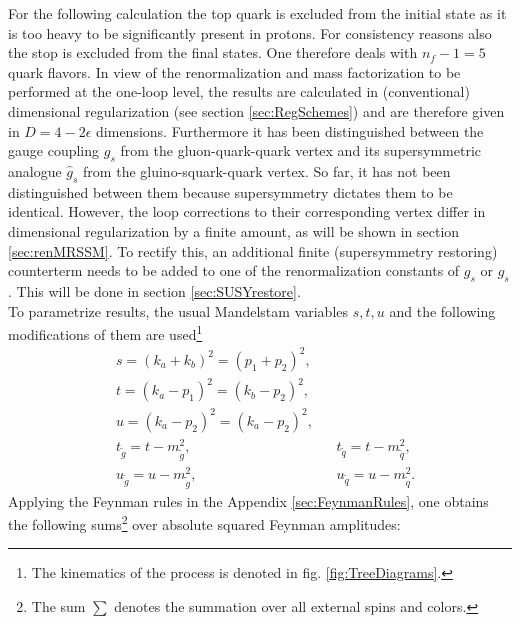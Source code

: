 For the following calculation the top quark is excluded from the initial state as it is too heavy to be significantly present in protons. %
For consistency reasons also the stop is excluded from the final states. One therefore deals with $n_f-1 = 5$ quark flavors. In view of the renormalization and mass factorization to be performed at the one-loop level, the results are calculated in (conventional) dimensional regularization (see section \ref{sec:RegSchemes}) and are therefore given in $D = 4 - 2\epsilon$ dimensions. Furthermore it has been distinguished between the gauge coupling $g_s$ from the gluon-quark-quark vertex and its supersymmetric analogue $\hat{g}_s$ from the gluino-squark-quark vertex. So far, it has not been distinguished between them because supersymmetry dictates them to be identical. However, the loop corrections to their corresponding vertex differ in dimensional regularization by a finite amount, as will be shown in section \ref{sec:renMRSSM}. To rectify this, an additional finite (supersymmetry restoring) counterterm needs to be added to one of the renormalization constants of $g_s$ or $\hat{g}_s$. This will be done in section \ref{sec:SUSYrestore}.\\
To parametrize results, the usual Mandelstam variables $s,t,u$ and the following modifications of them are used\footnote{The kinematics of the process is denoted in fig. \ref{fig:TreeDiagrams}.}
\begin{align}
& s = (k_a + k_b)^2 = (p_1 + p_2)^2,\nonumber\\
& t = (k_a - p_1)^2 = (k_b - p_2)^2,\nonumber\\
& u = (k_a - p_2)^2 = (k_a - p_2)^2,\nonumber\\
& t_{\tilde{g}} = t - m_{\tilde{g}}^2, && t_{\tilde{q}} = t- m_{\tilde{q}}^2,\nonumber\\
& u_{\tilde{g}} = u - m_{\tilde{g}}^2, && u_{\tilde{q}} = u- m_{\tilde{q}}^2.
\end{align}
\newpage
Applying the Feynman rules in the Appendix \ref{sec:FeynmanRules}, one obtains the following sums\footnote{The sum $\sum$ denotes the summation over all external spins and colors.} over absolute squared Feynman amplitudes:
